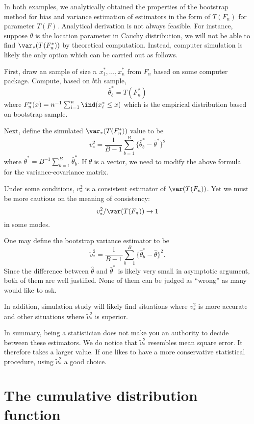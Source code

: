 \vs
In both examples, we analytically obtained the properties of
the bootstrap method for bias and variance estimation of
estimators in the form of $T(F_n)$ for parameter $T(F)$.
Analytical derivation is not always feasible. 
For instance, suppose $\theta$
is the location parameter in Cauchy distribution, we will not
be able to find $\var_*(T(F_n^*))$ by theoretical computation.
Instead, computer simulation is likely the only option
which can be carried out as follows.

First, draw an \iid sample of size $n$ $x_1^*, \ldots, x_n^*$ from $F_n$ based
on some computer package.
Compute, based on $b$th sample, 
\[
\hat \theta^*_b = T(F_n^*)
\]
where $F_n^*(x) = n^{-1} \sum_{i=1}^n \ind (x_i^*\leq x)$
which is the empirical distribution based on bootstrap sample.

Next, define the simulated $\var_*(T(F_n^*))$ value to be
\[
v_*^2 = \frac{1}{B-1} \sum_{b=1}^B \{ \hat \theta^*_b - \bar \theta^*\}^2
\]
where $\bar \theta^* = B^{-1} \sum_{b=1}^B \hat \theta_b^*$.
If $\theta$ is a vector, we need to modify the above formula
for the variance-covariance matrix.

Under some conditions, $v_*^2$ is a consistent estimator of $\var (T(F_n))$.
Yet we must be more cautious on the meaning of consistency:
\[
v_*^2/\var (T(F_n)) \to 1
\]
 in some modes.

One may define the bootstrap variance estimator to be
\[
\tilde {v}_*^2 = \frac{1}{B-1} \sum_{b=1}^B \{ \hat \theta^*_b - \hat \theta\}^2.
\]
Since the difference between $\hat \theta$ and $\bar \theta^*$ is likely
very small in asymptotic argument, both of them are well justified.
None of them can be judged as ``wrong'' as many would like to ask.

In addition, simulation study will likely find situations where $v_*^2$ is
more accurate and other situations where $\tilde{v}_*^2$ is superior.

In summary, being a statistician does not make you an authority to
decide between these estimators. We do notice that 
$\tilde {v}_*^2$ resembles mean square error. It therefore
takes a larger value. If one likes to have a more conservative
statistical procedure, using $\tilde {v}_*^2$ a good choice.



\section{The cumulative distribution function}

